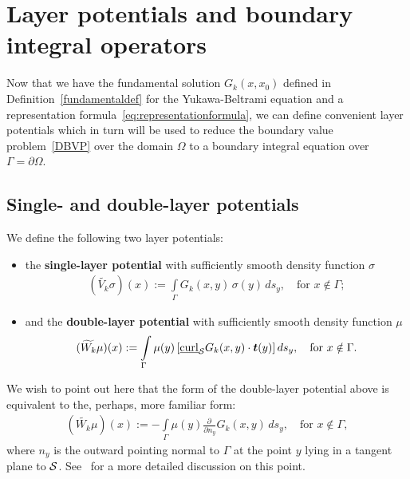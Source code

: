 \section{Layer potentials and boundary integral operators}
Now that we have the fundamental solution $G_k(x,x_0)$ defined in
Definition~\ref{fundamentaldef} for the Yukawa-Beltrami equation and a
representation formula~\eqref{eq:representationformula}, we can define
convenient layer potentials which in turn will be used to reduce the
boundary value problem~\eqref{DBVP} over the domain $\Omega$ to a
boundary integral equation over $\Gamma = \partial \Omega$.


\subsection{Single- and double-layer potentials}
We define the following two layer potentials:
\begin{itemize}
\item the {\bf single-layer potential} with sufficiently smooth density
function $\sigma$
  \begin{align}
    (\widetilde{V_k}\sigma)(x):=\int\limits_{\Gamma}
    G_k(x,y)\,\sigma(y)\,ds_y,\quad\mbox{for $x \notin \Gamma$};
    \label{singlelayerpotential}
  \end{align}
\item and the {\bf double-layer potential} with sufficiently smooth
density function $\mu$
  \begin{align}
    (\widetilde{W_k}\mu )(x):=\int\limits_{\Gamma}
    \mu(y)\,[\underline{\mbox{curl}}_{\S} G_k(x,y)\cdot \vec{t}(y)]\,
    ds_y, \quad\mbox{for $x\notin\Gamma$}.
    \label{doublelayerpotential}
  \end{align}
\end{itemize}
We wish to point out here that the form of the double-layer potential above is equivalent to the, perhaps, more familiar form:
\begin{align*}
  (\widetilde{W_k}\mu )(x):=-\int\limits_{\Gamma}
  \mu(y) \frac{\partial \,}{\partial n_y} G_k(x,y) \,
  ds_y, \quad\mbox{for $x\notin\Gamma$},
\end{align*}
where $n_{y}$ is the outward pointing normal to $\Gamma$ at the point
$y$ lying in a tangent plane to $\S$.  See~\cite{kro:nig2013} for a
more detailed discussion on this point.

